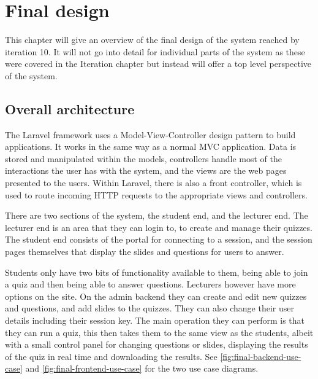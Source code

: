 \chapter{Final design}
This chapter will give an overview of the final design of the system reached by iteration 10. It will not go into detail for individual parts of the system as these were covered in the Iteration chapter but instead will offer a top level perspective of the system.

\section{Overall architecture}
The Laravel framework uses a Model-View-Controller design pattern\cite{mvc} to build applications. It works in the same way as a normal MVC application. Data is stored and manipulated within the models, controllers handle most of the interactions the user has with the system, and the views are the web pages presented to the users. Within Laravel, there is also a front controller, which is used to route incoming HTTP requests to the appropriate views and controllers\cite{Laravel-architechture}.

There are two sections of the system, the student end, and the lecturer end. The lecturer end is an area that they can login to, to create and manage their quizzes. The student end consists of the portal for connecting to a session, and the session pages themselves that display the slides and questions for users to answer.

Students only have two bits of functionality available to  them, being able to join a quiz and then being able to answer questions. Lecturers however have more options on the site. On the admin backend they can create and edit new quizzes and questions, and add slides to the quizzes. They can also change their user details including their session key. The main operation they can perform is that they can run a quiz, this then takes them to the same view as the students, albeit with a small control panel for changing questions or slides, displaying the results of the quiz in real time and downloading the results. See \ref{fig:final-backend-use-case} and \ref{fig:final-frontend-use-case} for the two use case diagrams.


